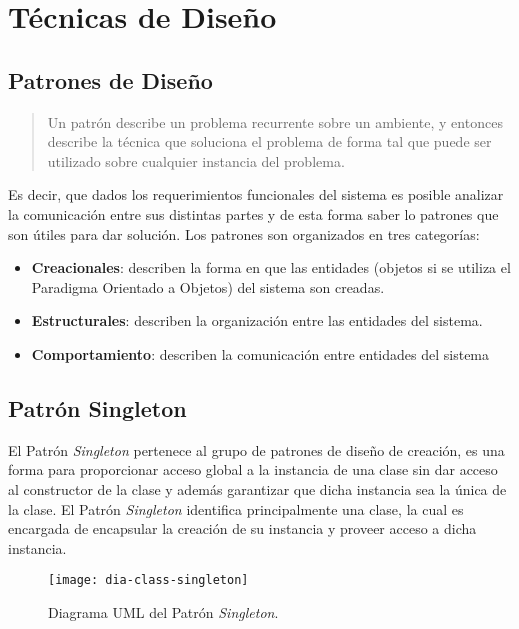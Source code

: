 \chapter{Técnicas de Diseño}\label{sec:patrones}

\section{Patrones de Diseño}
\begin{quote}
Un patrón describe un problema recurrente sobre un ambiente, y entonces describe la técnica que soluciona el problema de forma tal que puede ser utilizado sobre cualquier instancia del problema\cite{DesignPatterns}.
\end{quote}
Es decir, que dados los requerimientos funcionales del sistema es posible analizar la comunicación entre sus distintas partes y de esta forma saber lo patrones que son útiles para dar solución. Los patrones son organizados en tres categorías\cite{DesignPatterns}:
\begin{itemize}
	\item \textbf{Creacionales}: describen la forma en que las entidades (objetos si se utiliza el Paradigma Orientado a Objetos) del sistema son creadas.
	\item \textbf{Estructurales}: describen la organización entre las entidades del sistema.
	\item \textbf{Comportamiento}: describen la comunicación entre entidades del sistema
\end{itemize}

\section{Patrón Singleton}\label{sec:singleton}
El Patrón \textit{Singleton} pertenece al grupo de patrones de diseño de creación, es una forma para proporcionar acceso global a la instancia de una clase sin dar acceso al constructor de la clase y además garantizar que dicha instancia sea la única de la clase. El Patrón \textit{Singleton} identifica principalmente una clase, la cual es encargada de encapsular la creación de su instancia y proveer acceso a dicha instancia\cite{DesignPatternsLasater, DesignPatterns, OCPJavaSE7}.

\begin{figure}[h]
  \centering
  \texttt{[image: dia-class-singleton]}
  \caption{Diagrama UML del Patrón \textit{Singleton}\cite{DesignPatternsLasater}.}
  \label{fig:dia-class-singleton}
\end{figure}

